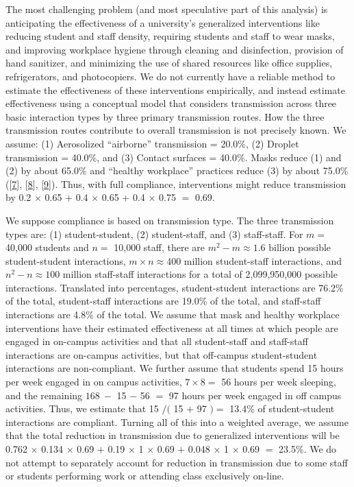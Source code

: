 \documentclass[
]{article}
\begin{document}
The most challenging problem (and most speculative part of this
analysis) is anticipating the effectiveness of a university's
generalized interventions like reducing student and staff density,
requiring students and staff to wear masks, and improving workplace
hygiene through cleaning and disinfection, provision of hand sanitizer,
and minimizing the use of shared resources like office supplies,
refrigerators, and photocopiers. We do not currently have a reliable
method to estimate the effectiveness of these interventions empirically,
and instead estimate effectiveness using a conceptual model that
considers transmission across three basic interaction types by three
primary transmission routes. How the three transmission routes
contribute to overall transmission is not precisely known. We assume:
(1) Aerosolized ``airborne'' transmission = 20.0\%, (2) Droplet
transmission = 40.0\%, and (3) Contact surfaces = 40.0\%. Masks reduce
(1) and (2) by about 65.0\% and ``healthy workplace'' practices reduce
(3) by about 75.0\% ({[}\protect\hyperlink{ref-Offeddu2017-ae}{7}{]},
{[}\protect\hyperlink{ref-Bowen2010-ht}{8}{]},
{[}\protect\hyperlink{ref-Reynolds2016-oy}{9}{]}). Thus, with full
compliance, interventions might reduce transmission by 0.2 \(\times\)
0.65 + 0.4 \(\times\) 0.65 + 0.4 \(\times\) 0.75 \(=\) 0.69.

We suppose compliance is based on transmission type. The three
transmission types are: (1) student-student, (2) student-staff, and (3)
staff-staff. For \(m=\) 40,000 students and \(n=\) 10,000 staff, there
are \(m^2-m \approx 1.6 \text{ billion}\) possible student-student
interactions, \(m \times n \approx 400 \text{ million}\) student-staff
interactions, and \(n^2-n \approx 100 \text{ million}\) staff-staff
interactions for a total of 2,099,950,000 possible interactions.
Translated into percentages, student-student interactions are 76.2\% of
the total, student-staff interactions are 19.0\% of the total, and
staff-staff interactions are 4.8\% of the total. We assume that mask and
healthy workplace interventions have their estimated effectiveness at
all times at which people are engaged in on-campus activities and that
all student-staff and staff-staff interactions are on-campus activities,
but that off-campus student-student interactions are non-compliant. We
further assume that students spend 15 hours per week engaged in on
campus activities, \(7 \times 8 =\) 56 hours per week sleeping, and the
remaining \(168~-\) 15 \(-\) 56 \(=\) 97 hours per week engaged in off
campus activities. Thus, we estimate that 15 \(/(\) 15 \(+\) 97 \()=\)
13.4\% of student-student interactions are compliant. Turning all of
this into a weighted average, we assume that the total reduction in
transmission due to generalized interventions will be 0.762 \(\times\)
0.134 \(\times\) 0.69 \(+\) 0.19 \(\times\) 1 \(\times\) 0.69 \(+\)
0.048 \(\times\) 1 \(\times\) 0.69 \(=\) 23.5\%. We do not attempt to
separately account for reduction in transmission due to some staff or
students performing work or attending class exclusively on-line.
\end{document}
